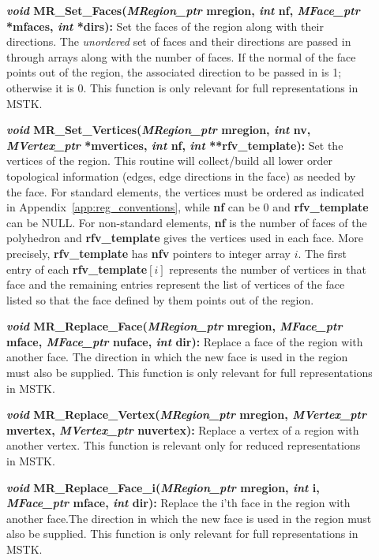 \documentclass[12pt]{article}
\begin{document}
\begin{description}
\item[]\textbf{\textit{void} MR\_Set\_Faces(\textit{MRegion\_ptr}
    mregion, \textit{int} nf, \textit{MFace\_ptr} *mfaces,
    \textit{int} *dirs):} Set the faces of the region along with their
  directions. The \textit{unordered} set of faces and their directions
  are passed in through arrays along with the number of faces. If the
  normal of the face points out of the region, the associated
  direction to be passed in is 1; otherwise it is 0. This function is
  only relevant for full representations in MSTK.
  
\item[]\textbf{\textit{void} MR\_Set\_Vertices(\textit{MRegion\_ptr}
    mregion, \textit{int} nv, \textit{MVertex\_ptr} *mvertices, 
    \textit{int} nf, \textit{int} **rfv\_template):} Set
  the vertices of the region. This routine will collect/build all
  lower order topological information (edges, edge directions in the
  face) as needed by the face. For standard elements, the vertices
  must be ordered as indicated in Appendix~\ref{app:reg_conventions},
  while \textbf{nf} can be 0 and \textbf{rfv\_template} can be NULL.
  For non-standard elements, \textbf{nf} is the number of faces of the
  polyhedron and \textbf{rfv\_template} gives the vertices used in each
  face. More precisely, \textbf{rfv\_template} has \textbf{nfv}
  pointers to integer array $i$. The first entry of each
  \textbf{rfv\_template$[i]$} represents the number of vertices in that
  face and the remaining entries represent the list of vertices of the
  face listed so that the face defined by them points out of the region.
  
\item[]\textbf{\textit{void} MR\_Replace\_Face(\textit{MRegion\_ptr}
    mregion, \textit{MFace\_ptr} mface, \textit{MFace\_ptr} nuface,
    \textit{int} dir):} Replace a face of the region with another
  face. The direction in which the new face is used in the region must
  also be supplied. This function is only relevant for full
  representations in MSTK.
  
\item[]\textbf{\textit{void} MR\_Replace\_Vertex(\textit{MRegion\_ptr}
    mregion, \textit{MVertex\_ptr} mvertex, \textit{MVertex\_ptr}
    nuvertex):} Replace a vertex of a region with another vertex. This
  function is relevant only for reduced representations in MSTK.
  
\item[]\textbf{\textit{void}
    MR\_Replace\_Face\_i(\textit{MRegion\_ptr} mregion, \textit{int}
    i, \textit{MFace\_ptr} mface, \textit{int} dir):} Replace the i'th
  face in the region with another face.The direction in which the new
  face is used in the region must also be supplied. This function is
  only relevant for full representations in MSTK.
  

\end{description}
\end{document}
